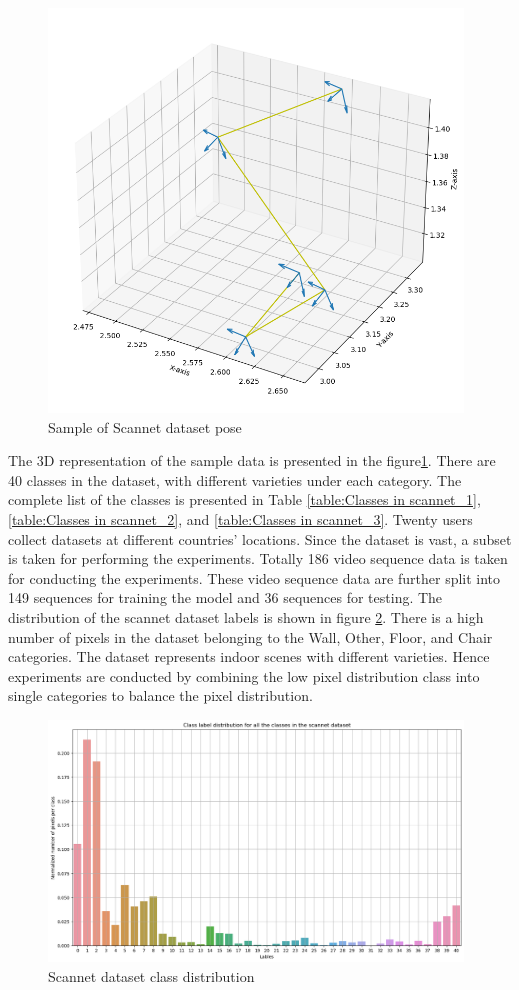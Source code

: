 	\begin{figure}[h]
		\centering
		\includegraphics[width=11cm]{images/pose_viz_scannet.png}
		\caption{Sample of Scannet dataset pose}
		\label{fig:sample_pose_scannet}
	\end{figure}
	
	The 3D representation of the sample data is presented in the figure\ref{fig:sample_pose_scannet}. There are 40 classes in the dataset, with different varieties under each category. The complete list of the classes is presented in Table \ref{table:Classes in scannet_1}, \ref{table:Classes in scannet_2}, and \ref{table:Classes in scannet_3}. Twenty users collect datasets at different countries' locations. Since the dataset is vast, a subset is taken for performing the experiments. Totally 186 video sequence data is taken for conducting the experiments. These video sequence data are further split into 149 sequences for training the model and 36 sequences for testing. The distribution of the scannet dataset labels is shown in figure \ref{fig:scannet_class_distribution}. There is a high number of pixels in the dataset belonging to the Wall, Other, Floor, and Chair categories. The dataset represents indoor scenes with different varieties. Hence experiments are conducted by combining the low pixel distribution class into single categories to balance the pixel distribution. 
	
	\begin{figure}
		\centering
		\includegraphics[width=11cm]{images/scannet_data_class_distribution.png}
		\caption{Scannet dataset class distribution}
		\label{fig:scannet_class_distribution}
	\end{figure}


